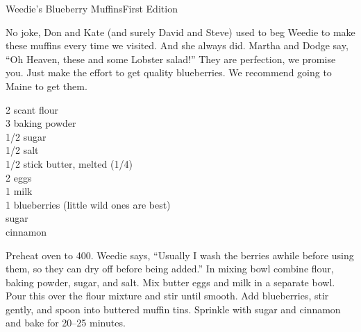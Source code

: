 \begin{entry}{Weedie's Blueberry Muffins}{First Edition}

\begin{open}
  No joke, Don and Kate (and surely David and Steve) used to beg Weedie
  to make these muffins every time we visited. And she always did. Martha and
  Dodge say, ``Oh Heaven, these and some Lobster salad!'' They are perfection,
  we promise you. Just make the effort to get quality blueberries. We
  recommend going to Maine to get them.
\end{open}
\begin{ingredients}
  2 scant \si{\cup} flour\\
  \SI{3}{\teaspoon} baking powder\\
  \SI{1/2}{\cup} sugar\\
  \SI{1/2}{\teaspoon} salt\\
  \num{1/2} stick butter, melted (\SI{1/4}{\cup})\\
  2 eggs\\
  \SI{1}{\cup} milk\\
  \SI{1}{\cup} blueberries (little wild ones are best)\\
  sugar\\
  cinnamon
\end{ingredients}
Preheat oven to \SI{400}{\degreeF}. Weedie says, ``Usually I wash the berries
awhile before using them, so they can dry off before being added.'' In mixing
bowl combine flour, baking powder, sugar, and salt. Mix butter eggs and milk
in a separate bowl. Pour this over the flour mixture and stir until
smooth. Add blueberries, stir gently, and spoon into buttered muffin
tins. Sprinkle with sugar and cinnamon and bake for \numrange{20}{25} minutes.
\end{entry}
